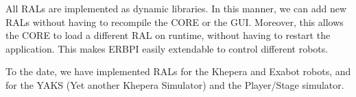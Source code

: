 All RALs are implemented as dynamic libraries. In this manner, we can add new RALs without having to recompile the CORE or the GUI. Moreover, this allows the CORE to load a different RAL on runtime, without having to restart the application. This makes ERBPI easily extendable to control different robots.

To the date, we have implemented RALs for the Khepera \cite{khepera} and Exabot \cite{exabot} robots, and for the YAKS (Yet another Khepera Simulator) \cite{yaks} and the Player/Stage \cite{player} simulator. 







